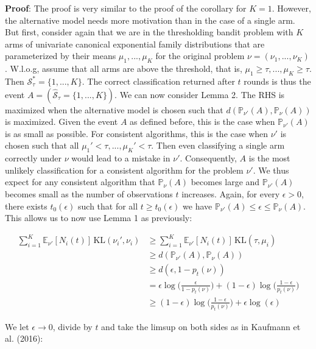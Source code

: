\documentclass[11pt,]{article}
\newcommand{\KL}{\,\text{KL}}
\begin{document}
\textbf{Proof}: The proof is very similar to the proof of the corollary
for \(K=1\). However, the alternative model needs more motivation than
in the case of a single arm. But first, consider again that we are in
the thresholding bandit problem with \(K\) arms of univariate canonical
exponential family distributions that are parameterized by their means
\(\mu_1, ..., \mu_K\) for the original problem
\(\nu = (\nu_1, ..., \nu_K)\). W.l.o.g, assume that all arms are above
the threshold, that is, \(\mu_1 \geq \tau, ..., \mu_K \geq \tau\). Then
\(\mathcal{S}_{\tau}^* = \{1, ... , K\}\). The correct classification
returned after \(t\) rounds is thus the event
\(A = (\hat{\mathcal{S}}_{\tau} = \{1, ..., K\})\). We can now consider
Lemma 2. The RHS is maximized when the alternative model is chosen such
that \(d(\mathbb{P}_{\nu'}(A), \mathbb{P}_{\nu}(A))\) is maximized.
Given the event \(A\) as defined before, this is the case when
\(\mathbb{P}_{\nu'}(A)\) is as small as possible. For consistent
algorithms, this is the case when \(\nu'\) is chosen such that all
\(\mu_1' < \tau, ..., \mu_K' < \tau\). Then even classifying a single
arm correctly under \(\nu\) would lead to a mistake in \(\nu'\).
Consequently, \(A\) is the most unlikely classification for a consistent
algorithm for the problem \(\nu'\). We thus expect for any consistent
algorithm that \(\mathbb{P}_{\nu}(A)\) becomes large and
\(\mathbb{P}_{\nu'}(A)\) becomes small as the number of observations
\(t\) increases. Again, for every \(\epsilon > 0\), there exists
\(t_0(\epsilon)\) such that for all \(t \geq t_0(\epsilon)\) we have
\(\mathbb{P}_{\nu'}(A) \leq \epsilon \leq \mathbb{P}_\nu(A)\). This
allows us to now use Lemma 1 as previously:

\begin{align*}
\sum_{i=1}^K \mathbb{E}_{\nu'}[N_i(t)]\KL(\nu_i', \nu_i) & \geq \sum_{i=1}^K \mathbb{E}_{\nu'}[N_i(t)]\KL(\tau, \mu_i) \\
& \geq d(\mathbb{P}_{\nu'}(A), \mathbb{P}_{\nu}(A)) \\
& \geq d(\epsilon, 1-p_t(\nu)) \\
& = \epsilon \log \Big(\frac{\epsilon}{1-p_t(\nu)}\Big) + (1-\epsilon) \log \Big( \frac{1-\epsilon}{p_t(\nu)}\Big) \\
& \geq (1-\epsilon) \log \Big(\frac{1-\epsilon}{p_t(\nu)}\Big) + \epsilon \log(\epsilon)
\end{align*}

We let \(\epsilon \rightarrow 0\), divide by \(t\) and take the limsup
on both sides as in Kaufmann et al. (2016):
\end{document}
